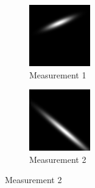 \documentclass[a4paper, 11pt, titlepage]{article}
\begin{document}
      \begin{figure}
      \centering
      \begin{subfigure}{.3\textwidth}
        \centering
        \includegraphics[width=.8\linewidth]{images/GaussianLine1.png}
        \caption{Measurement 1}
        \label{fig:uncProdsub1}
      \end{subfigure}%
      \begin{subfigure}{.3\textwidth}
        \centering
        \includegraphics[width=.8\linewidth]{images/GaussianLine2.png}
        \caption{Measurement 2}
        \label{fig:uncProdsub2}
      \end{subfigure}

\end{figure}
\end{document}
